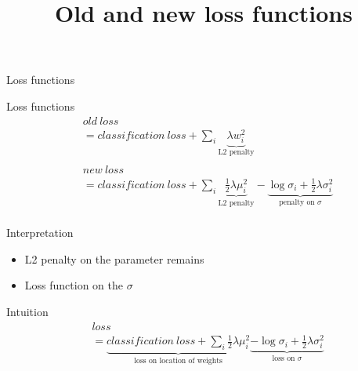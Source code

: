 \documentclass{beamer}
\newcommand{\undermath}[2]{\underbrace{#1}_\text{#2}}
\begin{document}
\begin{frame}{Loss functions}
	\title{Old and new loss functions}
	\begin{block}{Loss functions}
		\begin{align*}
			  & old \ loss                                                                                                                                                                    \\
			  & = classification \ loss +   \sum_i  \undermath{\lambda  w_i^2}{L2 penalty}                                                                                                    \\
			  &                                                                                                                                                                               \\
			  & new \ loss                                                                                                                                                                    \\		
			  & = classification \ loss +    \sum_i         \undermath{\frac{1}{2}\lambda\mu_i^2 }{L2 penalty}- \undermath{\log\sigma_i + \frac{1}{2}\lambda \sigma_i^2}{penalty on $\sigma$} \\
		\end{align*}
	\end{block}
		
	\begin{block}{Interpretation}
		\begin{itemize}
			\item L2 penalty on the parameter remains
			\item Loss function on the $\sigma$ 
		\end{itemize}
				
	\end{block}
\end{frame}


\begin{frame}{Intuition}
	\begin{align*}
		  & loss                                                                                                                                                                             \\
		  & = \undermath{classification \ loss + \sum_i \frac{1}{2}\lambda\mu_i^2 }{loss on location of weights} \undermath{-\log\sigma_i + \frac{1}{2}\lambda \sigma_i^2}{loss on $\sigma$} 
	\end{align*}
\end{frame}
\end{document}

